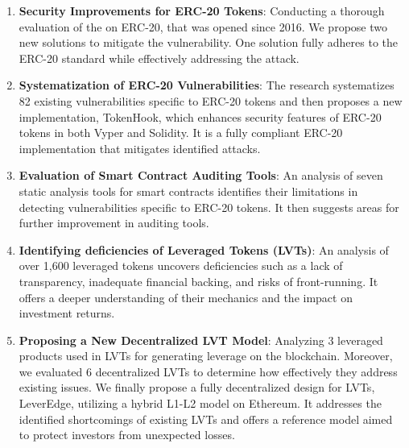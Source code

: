 \begin{enumerate}[label={\ref{sec:summary}.\arabic*},leftmargin=*]
	\item \textbf{Security Improvements for ERC-20 Tokens}: Conducting a thorough evaluation of the \mwa on ERC-20, that was opened since 2016. We propose two new solutions to mitigate the vulnerability. One solution fully adheres to the ERC-20 standard while effectively addressing the attack.

	\item \textbf{Systematization of ERC-20 Vulnerabilities}: The research systematizes 82 existing vulnerabilities specific to ERC-20 tokens and then proposes a new implementation, TokenHook, which enhances security features of ERC-20 tokens in both Vyper and Solidity. It is a fully compliant ERC-20 implementation that mitigates identified attacks.

	\item \textbf{Evaluation of Smart Contract Auditing Tools}: An analysis of seven static analysis tools for smart contracts identifies their limitations in detecting vulnerabilities specific to ERC-20 tokens. It then suggests areas for further improvement in auditing tools.

	\item \textbf{Identifying deficiencies of Leveraged Tokens (LVTs)}: An analysis of over 1,600 leveraged tokens uncovers deficiencies such as a lack of transparency, inadequate financial backing, and risks of front-running. It offers a deeper understanding of their mechanics and the impact on investment returns.

	\item \textbf{Proposing a New Decentralized LVT Model}: Analyzing 3 leveraged products used in LVTs for generating leverage on the blockchain. Moreover, we evaluated 6 decentralized LVTs to determine how effectively they address existing issues. We finally propose a fully decentralized design for LVTs, LeverEdge, utilizing a hybrid L1-L2 model on Ethereum. It addresses the identified shortcomings of existing LVTs and offers a reference model aimed to protect investors from unexpected losses.
\end{enumerate}

